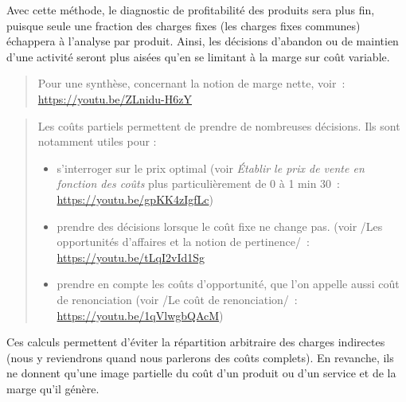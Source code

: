 \documentclass{tufte-handout}
\begin{document}
\begin{enumerate}
Avec cette méthode, le diagnostic de profitabilité des produits sera plus fin, puisque seule une fraction des charges fixes (les charges fixes communes) échappera à l'analyse par produit. Ainsi, les décisions d'abandon ou de maintien d'une activité seront plus aisées qu'en se limitant à la marge sur coût variable.\\

\begin{quote}
Pour une synthèse, concernant la notion de marge nette, voir : \url{https://youtu.be/ZLnidu-H6zY}\\
\end{quote}

\begin{quote}
Les coûts partiels permettent de prendre de nombreuses décisions. Ils sont notamment utiles pour :\\
\begin{itemize}
\item s'interroger sur le prix optimal (voir \emph{Établir le prix de vente en fonction des coûts} plus particulièrement de 0 à 1 min 30 : \url{https://youtu.be/gpKK4zIgfLc})\\
\item prendre des décisions lorsque le coût fixe ne change pas. (voir /Les opportunités d'affaires et la notion de pertinence/ : \url{https://youtu.be/tLqI2vId1Sg}\\
\item prendre en compte les coûts d'opportunité, que l'on appelle aussi coût de renonciation (voir /Le coût de renonciation/ : \url{https://youtu.be/1qVlwgbQAcM})\\
\end{itemize}
\end{quote}

Ces calculs permettent d'éviter la répartition arbitraire des charges indirectes (nous y reviendrons quand nous parlerons des coûts complets). En revanche, ils ne donnent qu'une image partielle du coût d'un produit ou d'un service et de la marge qu'il génère.\\


\end{enumerate}
\end{document}
